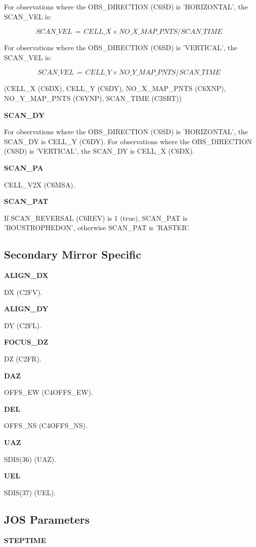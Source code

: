 \documentclass[twoside,11pt,nolof]{starlink}
\providecommand{\cellX}{CELL\_X (C6DX)}
\providecommand{\cellY}{CELL\_Y (C6DY)}
\providecommand{\cellVX}{CELL\_V2X (C6MSA)}
\providecommand{\nMapPtsX}{NO\_X\_MAP\_PNTS (C6XNP)}
\providecommand{\nMapPtsY}{NO\_Y\_MAP\_PNTS (C6YNP)}
\providecommand{\scanRev}{SCAN\_REVERSAL (C6REV)}
\providecommand{\obsDirection}{OBS\_DIRECTION (C6SD)}
\providecommand{\scanTime}{SCAN\_TIME (C3SRT)}
\providecommand{\userAz}{SDIS(36) (UAZ)}
\providecommand{\userEl}{SDIS(37) (UEL)}
\providecommand{\smuOffsEW}{OFFS\_EW (C4OFFS\_EW)}
\providecommand{\smuOffsNS}{OFFS\_NS (C4OFFS\_NS)}
\providecommand{\smuDX}{DX (C2FV)}
\providecommand{\smuDY}{DY (C2FL)}
\providecommand{\smuDZ}{DZ (C2FR)}
\begin{document}
For observations where the \obsDirection{} is 'HORIZONTAL', the SCAN\_VEL is:

\begin{equation}
SCAN\_VEL \,=\, CELL\_X \times NO\_X\_MAP\_PNTS / SCAN\_TIME
\end{equation}

For observations where the \obsDirection{} is 'VERTICAL', the SCAN\_VEL is:

\begin{equation}
SCAN\_VEL \,=\, CELL\_Y \times NO\_Y\_MAP\_PNTS / SCAN\_TIME
\end{equation}

(\cellX, \cellY, \nMapPtsX, \nMapPtsY, \scanTime)

\textbf{SCAN\_DY}

For observations where the \obsDirection{} is 'HORIZONTAL', the SCAN\_DY is \cellY.
For observations where the \obsDirection{} is 'VERTICAL', the SCAN\_DY is \cellX.

\textbf{SCAN\_PA}

\cellVX.

\textbf{SCAN\_PAT}

If \scanRev{} is 1 (true), SCAN\_PAT is 'BOUSTROPHEDON', otherwise SCAN\_PAT is 'RASTER'.

\subsection{Secondary Mirror Specific}

\textbf{ALIGN\_DX}

\smuDX.

\textbf{ALIGN\_DY}

 \smuDY.

\textbf{FOCUS\_DZ}

\smuDZ.

\textbf{DAZ}

\smuOffsEW.

\textbf{DEL}

\smuOffsNS.

\textbf{UAZ}

\userAz.

\textbf{UEL}

\userEl.

\subsection{JOS Parameters}

\textbf{STEPTIME}
\end{document}

